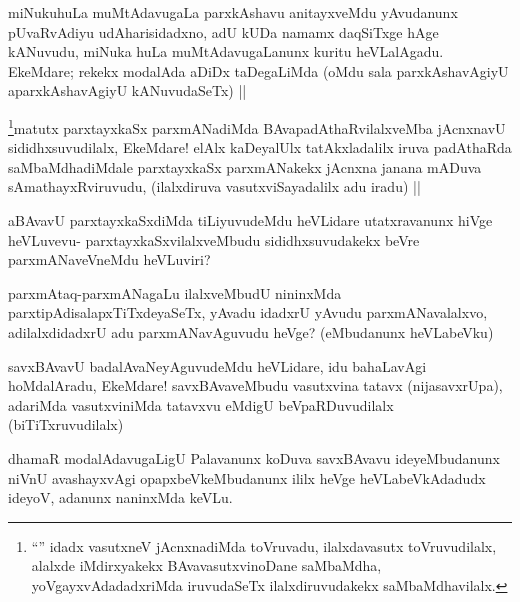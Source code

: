 \begin{artha}
miNukuhuLa muMtAdavugaLa parxkAshavu anitayxveMdu yAvudanunx pUvaRvAdiyu udAharisidadxno, adU kUDa namamx daqSiTxge hAge kANuvudu, miNuka huLa muMtAdavugaLanunx kuritu heVLalAgadu. EkeMdare; rekekx modalAda aDiDx taDegaLiMda (oMdu sala parxkAshavAgiyU aparxkAshavAgiyU kANuvudaSeTx) ||
\end{artha}

\begin{artha}
\footnote{``\stext'' idadx vasutxneV jAcnxnadiMda toVruvadu, ilalxdavasutx toVruvudilalx, alalxde iMdirxyakekx BAvavasutxvinoDane saMbaMdha, yoVgayxvAdadadxriMda iruvudaSeTx ilalxdiruvudakekx saMbaMdhavilalx.}matutx parxtayxkaSx parxmANadiMda BAvapadAthaRvilalxveMba jAcnxnavU sididhxsuvudilalx, EkeMdare! elAlx kaDeyalUlx tatAkxladalilx iruva padAthaRda saMbaMdhadiMdale parxtayxkaSx parxmANakekx jAcnxna janana mADuva sAmathayxRviruvudu, (ilalxdiruva vasutxviSayadalilx adu iradu) || 
\end{artha}

\begin{artha}
aBAvavU parxtayxkaSxdiMda tiLiyuvudeMdu heVLidare utatxravanunx hiVge heVLuvevu- parxtayxkaSxvilalxveMbudu sididhxsuvudakekx beVre parxmANaveVneMdu heVLuviri?
\end{artha}

\begin{artha}
parxmAtaq-parxmANagaLu ilalxveMbudU nininxMda parxtipAdisalapxTiTxdeyaSeTx, yAvadu idadxrU yAvudu parxmANavalalxvo, adilalxdidadxrU adu parxmANavAguvudu heVge? (eMbudanunx heVLabeVku)
\end{artha}

\begin{artha}
savxBAvavU badalAvaNeyAguvudeMdu heVLidare, idu bahaLavAgi hoMdalAradu, EkeMdare! savxBAvaveMbudu vasutxvina tatavx (nijasavxrUpa), adariMda vasutxviniMda tatavxvu eMdigU beVpaRDuvudilalx (biTiTxruvudilalx)
\end{artha}

\begin{artha}
dhamaR modalAdavugaLigU Palavanunx koDuva savxBAvavu ideyeMbudanunx niVnU avashayxvAgi opapxbeVkeMbudanunx ililx heVge heVLabeVkAdadudx ideyoV, adanunx naninxMda keVLu.
\end{artha}


